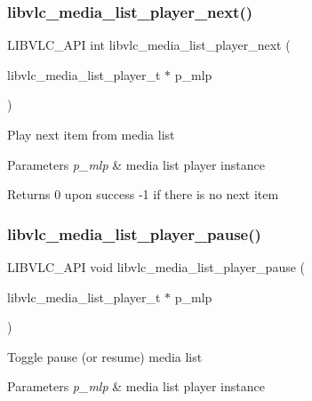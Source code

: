 \subsubsection{\texorpdfstring{libvlc\+\_\+media\+\_\+list\+\_\+player\+\_\+next()}{libvlc\_media\_list\_player\_next()}}
{\footnotesize\ttfamily L\+I\+B\+V\+L\+C\+\_\+\+A\+PI int libvlc\+\_\+media\+\_\+list\+\_\+player\+\_\+next (\begin{DoxyParamCaption}\item[{libvlc\+\_\+media\+\_\+list\+\_\+player\+\_\+t $\ast$}]{p\+\_\+mlp }\end{DoxyParamCaption})}

Play next item from media list


\begin{DoxyParams}{Parameters}
{\em p\+\_\+mlp} & media list player instance \\
\hline
\end{DoxyParams}
\begin{DoxyReturn}{Returns}
0 upon success -\/1 if there is no next item 
\end{DoxyReturn}
\mbox{\label{group__libvlc__media__list__player_ga405ee667bd3c08ac0d11bff9647ca806}} 
\subsubsection{\texorpdfstring{libvlc\+\_\+media\+\_\+list\+\_\+player\+\_\+pause()}{libvlc\_media\_list\_player\_pause()}}
{\footnotesize\ttfamily L\+I\+B\+V\+L\+C\+\_\+\+A\+PI void libvlc\+\_\+media\+\_\+list\+\_\+player\+\_\+pause (\begin{DoxyParamCaption}\item[{libvlc\+\_\+media\+\_\+list\+\_\+player\+\_\+t $\ast$}]{p\+\_\+mlp }\end{DoxyParamCaption})}

Toggle pause (or resume) media list


\begin{DoxyParams}{Parameters}
{\em p\+\_\+mlp} & media list player instance \\
\hline
\end{DoxyParams}
\mbox{\label{group__libvlc__media__list__player_ga7dea457c92634ff9db3037a054e3fa31}} 
